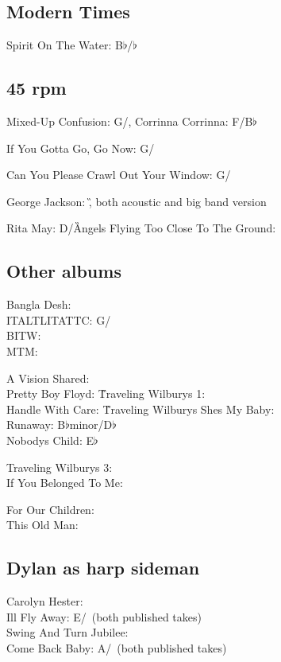 \begin{articlelayout}
\subsection{Modern Times}

Spirit On The Water: B$\flat$/\E$\flat$


\subsection*{45 rpm}

Mixed-Up Confusion: G/\C, Corrinna Corrinna: F/B$\flat$


If You Gotta Go, Go Now: G/\C


Can You Please Crawl Out Your Window: G/\C


George Jackson: \G, both acoustic and big band version


Rita May: D/\G


Angels Flying Too Close To The Ground: \A

\subsection*{Other albums}


Bangla Desh: \\ ITALTLITATTC: G/\C\\ BITW: \G\\ MTM: \E


A Vision Shared: \\ Pretty Boy Floyd: \G


Traveling Wilburys 1: \\ Handle With Care: \G


Traveling Wilburys Shes My Baby: \\ Runaway: B$\flat$minor/D$\flat$\\ Nobodys
Child: E$\flat$


Traveling Wilburys 3: \\ If You Belonged To Me: \D


For Our Children: \\ This Old Man: \C


\subsection{Dylan as harp sideman}

Carolyn Hester: \\ Ill Fly Away: E/\A\ (both published takes)\\ Swing
And Turn Jubilee: \G\\ Come Back Baby: A/\D\ (both published takes)



\end{articlelayout}
